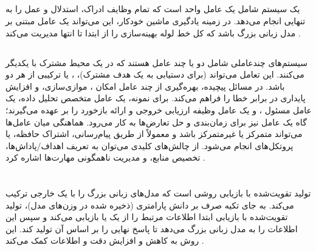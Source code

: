 \subsection[تک‌عاملی]{}
یک سیستم  شامل یک عامل واحد است که تمام وظایف ادراک، استدلال و عمل را به تنهایی انجام می‌دهد. در زمینه یادگیری ماشین خودکار، این می‌تواند یک عامل مبتنی بر مدل زبانی بزرگ باشد که کل خط لوله بهینه‌سازی را از ابتدا تا انتها مدیریت می‌کند \cite{wang2024survey}.

\subsection[چندعاملی]{}
سیستم‌های چندعاملی شامل دو یا چند عامل هستند که در یک محیط مشترک با یکدیگر  می‌کنند. این تعامل می‌تواند  (برای دستیابی به یک هدف مشترک)، ، یا ترکیبی از هر دو باشد. در مسائل پیچیده، بهره‌گیری از چند عامل امکان ، موازی‌سازی، و افزایش پایداری در برابر خطا را فراهم می‌کند. برای نمونه، یک عامل متخصص تحلیل داده، یک عامل مسئول ، و یک عامل  وظیفه ارزیابی خروجی و ارائه بازخورد را بر عهده می‌گیرند؛ گاه یک عامل  نیز برای زمان‌بندی و حل تعارض‌ها  به کار می‌رود. هماهنگی میان عامل‌ها می‌تواند متمرکز یا غیرمتمرکز باشد و معمولاً از طریق پیام‌رسانی، اشتراک حافظه، یا پروتکل‌های  انجام می‌شود. از چالش‌های کلیدی می‌توان به تعریف اهداف/پاداش‌ها، تخصیص منابع، و مدیریت ناهمگونی مهارت‌ها اشاره کرد \cite{wang2024survey}.
\section[تولید تقویت‌شده با بازیابی]{}
تولید تقویت‌شده با بازیابی \cite{Lewis2020RAG} روشی است که مدل‌های زبانی بزرگ را با یک  خارجی ترکیب می‌کند. به جای تکیه صرف بر دانش پارامتری (ذخیره شده در وزن‌های مدل)، تولید تقویت‌شده با بازیابی ابتدا اطلاعات مرتبط را از یک  یا  بازیابی می‌کند و سپس این اطلاعات را به مدل زبانی بزرگ می‌دهد تا پاسخ نهایی را بر اساس آن تولید کند. این روش به کاهش  و افزایش دقت و  اطلاعات کمک می‌کند \cite{xia2025ragselfreasoning}.

